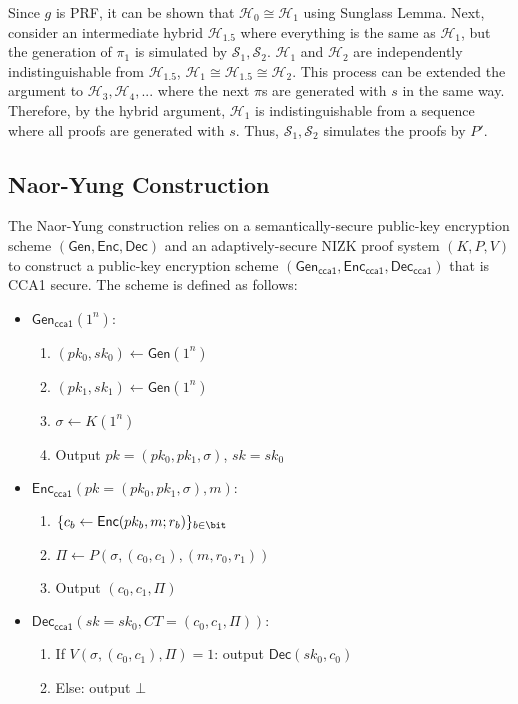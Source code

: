 Since $g$ is PRF, it can be shown that $\mathcal{H}_0 \cong \mathcal{H}_1$ using Sunglass Lemma. Next, consider an intermediate hybrid $\mathcal{H}_{1.5}$ where everything is the same as $\mathcal{H}_1$, but the generation of $\pi_1$ is simulated by $\mathcal{S}_1, \mathcal{S}_2$. $\mathcal{H}_1$ and $\mathcal{H}_2$ are independently indistinguishable from $\mathcal{H}_{1.5}$, $\mathcal{H}_1 \cong \mathcal{H}_{1.5} \cong \mathcal{H}_2$. This process can be extended the argument to $\mathcal{H}_3, \mathcal{H}_4,...$ where the next $\pi$s are generated with $s$ in the same way. Therefore, by the hybrid argument, $\mathcal{H}_1$ is indistinguishable from a sequence where all proofs are generated with $s$. Thus, $\mathcal{S}_1, \mathcal{S}_2$ simulates the proofs by $P'$.



\subsection{Naor-Yung Construction}

The Naor-Yung construction relies on a semantically-secure public-key encryption scheme $(\mathsf{Gen}, \mathsf{Enc}, \mathsf{Dec})$ and an adaptively-secure NIZK proof system $(K, P, V)$ to construct a public-key encryption scheme $(\mathsf{Gen_{cca1}}, \mathsf{Enc_{cca1}}, \mathsf{Dec_{cca1}})$ that is CCA1 secure. The scheme is defined as follows:

\begin{itemize}
    \item $\mathsf{Gen_{cca1}}(1^n): $
    \begin{enumerate}
        \item $(pk_0, sk_0) \gets \mathsf{Gen}(1^n)$
        \item $(pk_1, sk_1) \gets \mathsf{Gen}(1^n)$
        \item $\sigma \gets K(1^n)$
        \item Output $pk = (pk_0, pk_1, \sigma)$, $sk = sk_0$
    \end{enumerate}
    \item $\mathsf{Enc_{cca1}}(pk = (pk_0, pk_1, \sigma), m): $
    \begin{enumerate}
        \item $\{c_b \gets \mathsf{Enc}(pk_b, m; r_b)\}_{b\in\bit}$
        \item $\Pi \gets P(\sigma, (c_0, c_1), (m, r_0, r_1))$
        \item Output $(c_0, c_1, \Pi)$
    \end{enumerate}
    \item  $\mathsf{Dec_{cca1}}(sk = sk_0, CT = (c_0, c_1, \Pi)): $
    \begin{enumerate}
        \item If $V(\sigma, (c_0, c_1), \Pi) = 1$: output $\mathsf{Dec}(sk_0, c_0)$
        \item Else: output $\bot$
    \end{enumerate}
\end{itemize}

